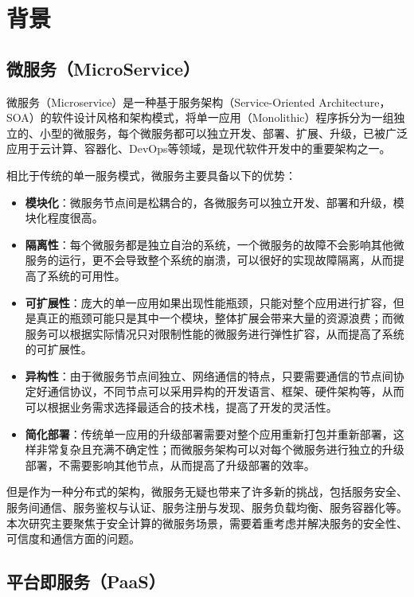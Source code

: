 \section{背景}\label{sec:background}

\subsection{微服务（MicroService）}
微服务（Microservice）是一种基于服务架构（Service-Oriented Architecture，SOA）的软件设计风格和架构模式，将单一应用（Monolithic）程序拆分为一组独立的、小型的微服务，每个微服务都可以独立开发、部署、扩展、升级，已被广泛应用于云计算、容器化、DevOps等领域，是现代软件开发中的重要架构之一。

相比于传统的单一服务模式，微服务主要具备以下的优势：

\begin{itemize}
    \item \textbf{模块化}：微服务节点间是松耦合的，各微服务可以独立开发、部署和升级，模块化程度很高。
    \item \textbf{隔离性}：每个微服务都是独立自治的系统，一个微服务的故障不会影响其他微服务的运行，更不会导致整个系统的崩溃，可以很好的实现故障隔离，从而提高了系统的可用性。
    \item \textbf{可扩展性}：庞大的单一应用如果出现性能瓶颈，只能对整个应用进行扩容，但是真正的瓶颈可能只是其中一个模块，整体扩展会带来大量的资源浪费；而微服务可以根据实际情况只对限制性能的微服务进行弹性扩容，从而提高了系统的可扩展性。
    \item \textbf{异构性}：由于微服务节点间独立、网络通信的特点，只要需要通信的节点间协定好通信协议，不同节点可以采用异构的开发语言、框架、硬件架构等，从而可以根据业务需求选择最适合的技术栈，提高了开发的灵活性。
    \item \textbf{简化部署}：传统单一应用的升级部署需要对整个应用重新打包并重新部署，这样非常复杂且充满不确定性；而微服务架构可以对每个微服务进行独立的升级部署，不需要影响其他节点，从而提高了升级部署的效率。
\end{itemize}

但是作为一种分布式的架构，微服务无疑也带来了许多新的挑战，包括服务安全、服务间通信、服务鉴权与认证、服务注册与发现、服务负载均衡、服务容器化等。本次研究主要聚焦于安全计算的微服务场景，需要着重考虑并解决服务的安全性、可信度和通信方面的问题。

\subsection{平台即服务（PaaS）}

